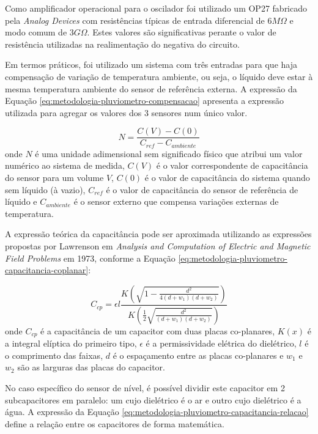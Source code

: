 \documentclass[a4paper]{instrumentacao}
\begin{document}
Como amplificador operacional para o oscilador foi utilizado um OP27 fabricado pela \textit{Analog Devices} com resistências típicas de entrada diferencial de $6 M\Omega$ e modo comum de $3 G\Omega$. Estes valores são significativas perante o valor de resistência utilizadas na realimentação do negativa do circuito.

Em termos práticos, foi utilizado um sistema com três entradas para que haja compensação de variação de temperatura ambiente, ou seja, o líquido deve estar à mesma temperatura ambiente do sensor de referência externa. A expressão da Equação \ref{eq:metodologia-pluviometro-compensacao} apresenta a expressão utilizada para agregar os valores dos 3 sensores num único valor.

\begin{equation}
	N = \frac{C(V) - C(0)}{C_{ref} - C_{ambiente}}
	\label{eq:metodologia-pluviometro-compensacao}
\end{equation}
\noindent onde $N$ é uma unidade adimensional sem significado físico que atribui um valor numérico ao sistema de medida, $C(V)$ é o valor correspondente de capacitância do sensor para um volume $V$, $C(0)$ é o valor de capacitância do sistema quando sem líquido (à vazio), $C_{ref}$ é o valor de capacitância do sensor de referência de líquido e $C_{ambiente}$ é o sensor externo que compensa variações externas de temperatura.

A expressão teórica da capacitância pode ser aproximada utilizando as expressões propostas por Lawrenson em \textit{Analysis and Computation of Electric and Magnetic Field Problems}\cite{capacitor-plano} em 1973, conforme a Equação \ref{eq:metodologia-pluviometro-capacitancia-coplanar}:

\begin{equation}
	C_{cp} = \epsilon l \frac{K\left(\sqrt{1-\frac{d^2}{4 (d+w_1) (d+w_2)}}\right)}{K\left(\frac{1}{2} \sqrt{\frac{d^2}{(d+w_1) (d+w_2)}}\right)}
	\label{eq:metodologia-pluviometro-capacitancia-coplanar}
\end{equation}
\noindent onde $C_{cp}$ é a capacitância de um capacitor com duas placas co-planares, $K(x)$ é a integral elíptica do primeiro tipo, $\epsilon$ é a permissividade elétrica do dielétrico, $l$ é o comprimento das faixas, $d$ é o espaçamento entre as placas co-planares e $w_1$ e $w_2$ são as larguras das placas do capacitor.

No caso específico do sensor de nível, é possível dividir este capacitor em 2 subcapacitores em paralelo: um cujo dielétrico é o ar e outro cujo dielétrico é a água. A expressão da Equação \ref{eq:metodologia-pluviometro-capacitancia-relacao} define a relação entre os capacitores de forma matemática.
\end{document}
